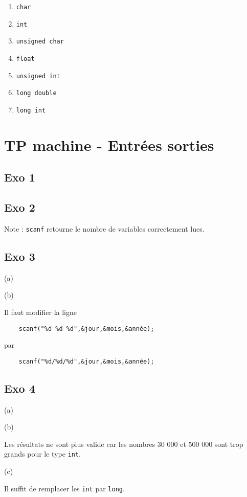 \documentclass{article}
\begin{document}
\begin{enumerate}
    \item \texttt{char}
    \item \texttt{int}
    \item \texttt{unsigned char}
    \item \texttt{float}
    \item \texttt{unsigned int}
    \item \texttt{long double}
    \item \texttt{long int}
\end{enumerate}

\section{TP machine - Entrées sorties}

\subsection{Exo 1}



\subsection{Exo 2}



Note : \texttt{scanf} retourne le nombre de variables correctement 
lues.

\subsection{Exo 3}
(a)



(b)

Il faut modifier la ligne 
\begin{verbatim}
    scanf("%d %d %d",&jour,&mois,&année);
\end{verbatim}

par 

\begin{verbatim}
    scanf("%d/%d/%d",&jour,&mois,&année);
\end{verbatim}

\subsection{Exo 4}

(a)



(b)

Les résultats ne sont plus valide car les nombres 30 000 et 500 000
sont trop grands pour le type \texttt{int}.

(c)

Il suffit de remplacer les \texttt{int} par \texttt{long}.
\end{document}
